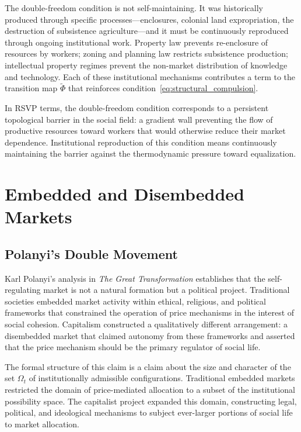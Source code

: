 \documentclass[12pt,a4paper]{article}
\theoremstyle{definition}
\theoremstyle{remark}
\begin{document}
The double-freedom condition is not self-maintaining. It was historically produced through specific processes---enclosures, colonial land expropriation, the destruction of subsistence agriculture---and it must be continuously reproduced through ongoing institutional work. Property law prevents re-enclosure of resources by workers; zoning and planning law restricts subsistence production; intellectual property regimes prevent the non-market distribution of knowledge and technology. Each of these institutional mechanisms contributes a term to the transition map $\tilde{\Phi}$ that reinforces condition~\eqref{eq:structural_compulsion}.

In RSVP terms, the double-freedom condition corresponds to a persistent topological barrier in the social field: a gradient wall preventing the flow of productive resources toward workers that would otherwise reduce their market dependence. Institutional reproduction of this condition means continuously maintaining the barrier against the thermodynamic pressure toward equalization.

\section{Embedded and Disembedded Markets}
\label{sec:embedding}

\subsection{Polanyi's Double Movement}

Karl Polanyi's analysis in \emph{The Great Transformation} establishes that the self-regulating market is not a natural formation but a political project. Traditional societies embedded market activity within ethical, religious, and political frameworks that constrained the operation of price mechanisms in the interest of social cohesion. Capitalism constructed a qualitatively different arrangement: a disembedded market that claimed autonomy from these frameworks and asserted that the price mechanism should be the primary regulator of social life.

The formal structure of this claim is a claim about the size and character of the set $\Omega_t$ of institutionally admissible configurations. Traditional embedded markets restricted the domain of price-mediated allocation to a subset of the institutional possibility space. The capitalist project expanded this domain, constructing legal, political, and ideological mechanisms to subject ever-larger portions of social life to market allocation.
\end{document}

